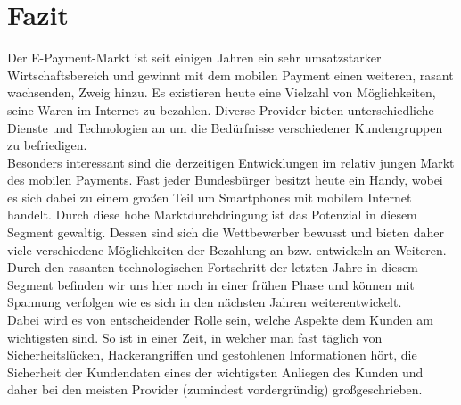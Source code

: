 \clearpage
\section{Fazit}
Der E-Payment-Markt ist seit einigen Jahren ein sehr umsatzstarker Wirtschaftsbereich und gewinnt mit dem mobilen Payment einen weiteren, rasant wachsenden, Zweig hinzu. Es existieren heute eine Vielzahl von Möglichkeiten, seine Waren im Internet zu bezahlen. Diverse Provider bieten unterschiedliche Dienste und Technologien an um die Bedürfnisse verschiedener Kundengruppen zu befriedigen.\\
Besonders interessant sind die derzeitigen Entwicklungen im relativ jungen Markt des mobilen Payments. Fast jeder Bundesbürger besitzt heute ein Handy, wobei es sich dabei zu einem großen Teil um Smartphones mit mobilem Internet handelt. Durch diese hohe Marktdurchdringung ist das Potenzial in diesem Segment gewaltig. Dessen sind sich die Wettbewerber bewusst und bieten daher viele verschiedene Möglichkeiten der Bezahlung an bzw. entwickeln an Weiteren. Durch den rasanten technologischen Fortschritt der letzten Jahre in diesem Segment befinden wir uns hier noch in einer frühen Phase und können mit Spannung verfolgen wie es sich in den nächsten Jahren weiterentwickelt.\\
Dabei wird es von entscheidender Rolle sein, welche Aspekte dem Kunden am wichtigsten sind. So ist in einer Zeit, in welcher man fast täglich von Sicherheitslücken, Hackerangriffen und gestohlenen Informationen hört, die Sicherheit der Kundendaten eines der wichtigsten Anliegen des Kunden und daher bei den meisten Provider (zumindest vordergründig) großgeschrieben.
